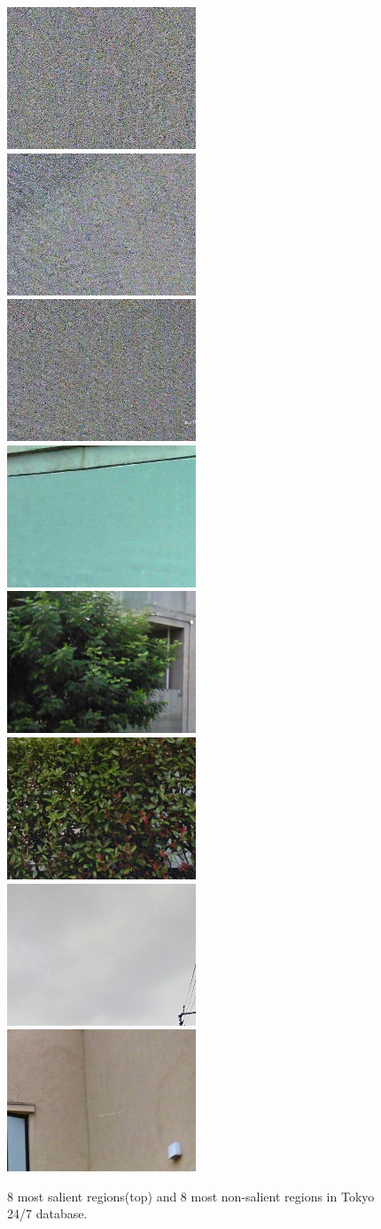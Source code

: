 \begin{figure}[htbp]
\includegraphics[width=0.2\linewidth]{img/nonsal_1}
\includegraphics[width=0.2\linewidth]{img/nonsal_2}
\includegraphics[width=0.2\linewidth]{img/nonsal_3}
\includegraphics[width=0.2\linewidth]{img/nonsal_4}
\\[0.1cm]
\includegraphics[width=0.2\linewidth]{img/nonsal_5}
\includegraphics[width=0.2\linewidth]{img/nonsal_6}
\includegraphics[width=0.2\linewidth]{img/nonsal_7}
\includegraphics[width=0.2\linewidth]{img/nonsal_8}
\\
\caption{8 most salient regions(top) and 8 most non-salient regions in Tokyo 24/7 database.}
\label{fig:saliency}
\end{figure}

